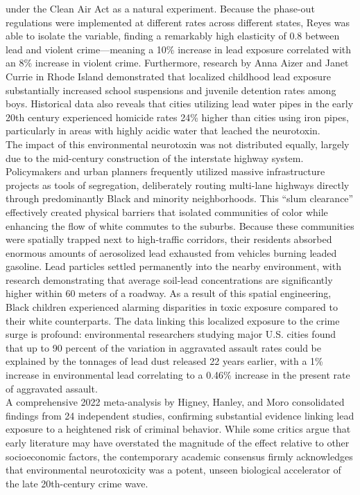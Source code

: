 \documentclass[
]{article}
\begin{document}
under the Clean Air Act as a natural experiment. Because the phase-out
regulations were implemented at different rates across different states,
Reyes was able to isolate the variable, finding a remarkably high
elasticity of 0.8 between lead and violent crime---meaning a 10\%
increase in lead exposure correlated with an 8\% increase in violent
crime. Furthermore, research by Anna Aizer and Janet Currie in Rhode
Island demonstrated that localized childhood lead exposure substantially
increased school suspensions and juvenile detention rates among boys.
Historical data also reveals that cities utilizing lead water pipes in
the early 20th century experienced homicide rates 24\% higher than
cities using iron pipes, particularly in areas with highly acidic water
that leached the neurotoxin.\\
The impact of this environmental neurotoxin was not distributed equally,
largely due to the mid-century construction of the interstate highway
system. Policymakers and urban planners frequently utilized massive
infrastructure projects as tools of segregation, deliberately routing
multi-lane highways directly through predominantly Black and minority
neighborhoods. This ``slum clearance'' effectively created physical
barriers that isolated communities of color while enhancing the flow of
white commutes to the suburbs. Because these communities were spatially
trapped next to high-traffic corridors, their residents absorbed
enormous amounts of aerosolized lead exhausted from vehicles burning
leaded gasoline. Lead particles settled permanently into the nearby
environment, with research demonstrating that average soil-lead
concentrations are significantly higher within 60 meters of a roadway.
As a result of this spatial engineering, Black children experienced
alarming disparities in toxic exposure compared to their white
counterparts. The data linking this localized exposure to the crime
surge is profound: environmental researchers studying major U.S. cities
found that up to 90 percent of the variation in aggravated assault rates
could be explained by the tonnages of lead dust released 22 years
earlier, with a 1\% increase in environmental lead correlating to a
0.46\% increase in the present rate of aggravated assault.\\
A comprehensive 2022 meta-analysis by Higney, Hanley, and Moro
consolidated findings from 24 independent studies, confirming
substantial evidence linking lead exposure to a heightened risk of
criminal behavior. While some critics argue that early literature may
have overstated the magnitude of the effect relative to other
socioeconomic factors, the contemporary academic consensus firmly
acknowledges that environmental neurotoxicity was a potent, unseen
biological accelerator of the late 20th-century crime wave.
\end{document}
